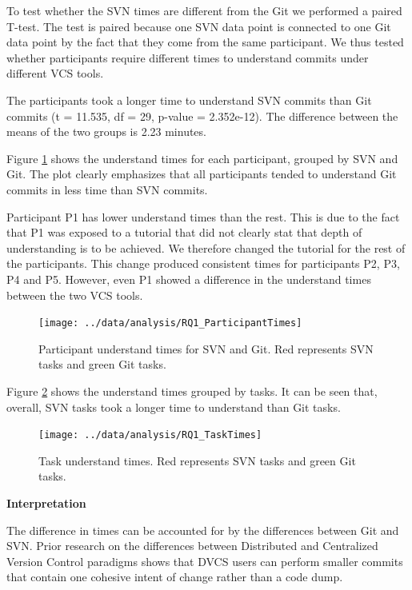 \documentclass[letterpaper]{article}
\begin{document}
To test whether the SVN times are different from the Git we performed a paired T-test.
The test is paired because one SVN data point is connected to one Git data point by the fact that they come from the same participant.
We thus tested whether participants require different times to understand commits under different VCS tools.

The participants took a longer time to understand SVN commits than Git commits (t = 11.535, df = 29, p-value = 2.352e-12). The difference between the means of the two groups is 2.23 minutes.

Figure \ref{fig:rq1-participantTimes} shows the understand times for each participant, grouped by SVN and Git.
The plot clearly emphasizes that all participants tended to understand Git commits in less time than SVN commits.

Participant P1 has lower understand times than the rest.
This is due to the fact that P1 was exposed to a tutorial that did not clearly stat that depth of understanding is to be achieved.
We therefore changed the tutorial for the rest of the participants.
This change produced consistent times for participants P2, P3, P4 and P5.
However, even P1 showed a difference in the understand times between the two VCS tools.

\begin{figure}[H]
    \centering
    \texttt{[image: ../data/analysis/RQ1\_ParticipantTimes]}
    \caption{Participant understand times for SVN and Git. Red represents SVN tasks and green Git tasks.}
    \label{fig:rq1-participantTimes}
\end{figure}

Figure \ref{fig:rq1-taskTimes} shows the understand times grouped by tasks.
It can be seen that, overall, SVN tasks took a longer time to understand than Git tasks.

\begin{figure}[H]
    \centering
    \texttt{[image: ../data/analysis/RQ1\_TaskTimes]}
    \caption{Task understand times. Red represents SVN tasks and green Git tasks.}
    \label{fig:rq1-taskTimes}
\end{figure}


\textbf{Interpretation}

The difference in times can be accounted for by the differences between Git and SVN. 
Prior research on the differences between Distributed and Centralized Version Control paradigms shows that DVCS users can perform smaller commits that contain one cohesive intent of change rather than a code dump.
\end{document}
